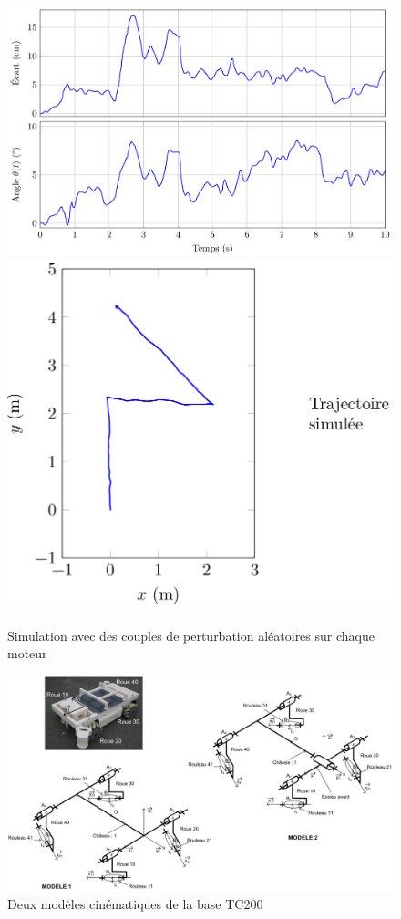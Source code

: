 \begin{figure}[!ht]
\begin{center}
 \includegraphics[width=0.8\linewidth]{img/fig23_1.png} \\
 \includegraphics[width=0.4\linewidth]{img/fig23_2.png}
 \end{center}
  \caption{Simulation avec des couples de perturbation aléatoires sur chaque moteur}
\label{fig23}
\end{figure}

\begin{figure}[!ht]
\begin{center}
 \includegraphics[angle=90,width=0.75\linewidth]{img/fig24.png}
 \end{center}
  \caption{Deux modèles cinématiques de la base TC200}
\label{fig24}
\end{figure}


